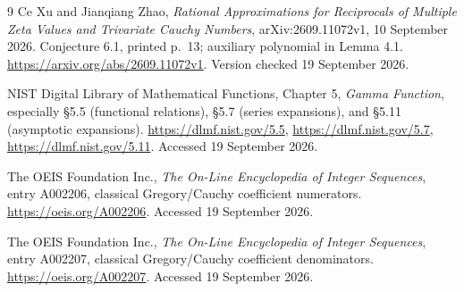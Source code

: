 \documentclass[11pt]{article}
\numberwithin{equation}{section}
\theoremstyle{definition}
\begin{document}
\clearpage
\begin{thebibliography}{9}
Ce Xu and Jianqiang Zhao,
\emph{Rational Approximations for Reciprocals of Multiple Zeta Values and
Trivariate Cauchy Numbers}, arXiv:2609.11072v1, 10 September 2026.
Conjecture 6.1, printed p.~13; auxiliary polynomial in Lemma 4.1.
\url{https://arxiv.org/abs/2609.11072v1}.
Version checked 19 September 2026.

NIST Digital Library of Mathematical Functions,
Chapter 5, \emph{Gamma Function}, especially
\S5.5 (functional relations), \S5.7 (series expansions), and
\S5.11 (asymptotic expansions).
\url{https://dlmf.nist.gov/5.5},
\url{https://dlmf.nist.gov/5.7},
\url{https://dlmf.nist.gov/5.11}.
Accessed 19 September 2026.

The OEIS Foundation Inc.,
\emph{The On-Line Encyclopedia of Integer Sequences}, entry A002206,
classical Gregory/Cauchy coefficient numerators.
\url{https://oeis.org/A002206}.
Accessed 19 September 2026.

The OEIS Foundation Inc.,
\emph{The On-Line Encyclopedia of Integer Sequences}, entry A002207,
classical Gregory/Cauchy coefficient denominators.
\url{https://oeis.org/A002207}.
Accessed 19 September 2026.
\end{thebibliography}
\end{document}
